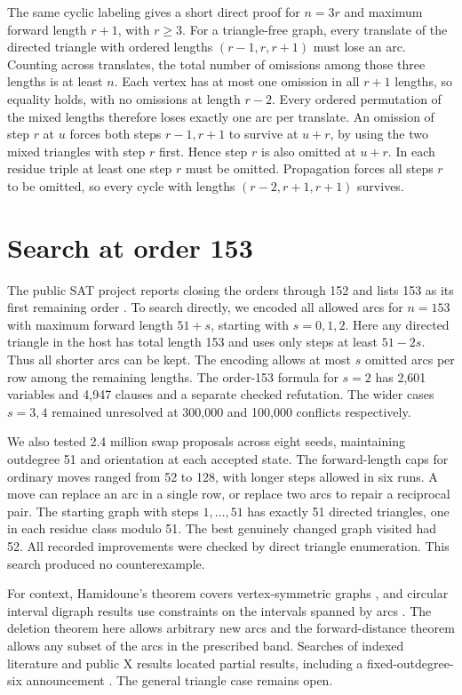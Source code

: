 \documentclass[10pt]{article}
\begin{document}
The same cyclic labeling gives a short direct proof for \(n=3r\) and
maximum forward length \(r+1\), with \(r\ge3\). For a triangle-free
graph, every translate of the directed triangle with ordered lengths
\((r-1,r,r+1)\) must lose an arc. Counting across translates, the total
number of omissions among those three lengths is at least \(n\).
Each vertex has at most one omission in all \(r+1\) lengths, so equality
holds, with no omissions at length \(r-2\). Every ordered permutation
of the mixed lengths therefore loses exactly one arc per translate.
An omission of step \(r\) at \(u\) forces both steps \(r-1,r+1\)
to survive at \(u+r\), by using the two mixed triangles with step \(r\)
first. Hence step \(r\) is also omitted at \(u+r\). In each residue
triple at least one step \(r\) must be omitted. Propagation forces all
steps \(r\) to be omitted, so every cycle with lengths
\((r-2,r+1,r+1)\) survives.

\section{Search at order 153}

The public SAT project reports closing the orders through 152 and lists
153 as its first remaining order \cite{campaign}. To search directly,
we encoded all allowed arcs for \(n=153\) with maximum forward length
\(51+s\), starting with \(s=0,1,2\). Here any directed triangle in
the host has total length 153 and uses only steps at least \(51-2s\).
Thus all shorter arcs can be kept. The encoding allows at most \(s\)
omitted arcs per row among the remaining lengths. The order-153
formula for \(s=2\) has 2,601 variables and 4,947 clauses and a separate
checked refutation. The wider cases \(s=3,4\) remained unresolved at
300,000 and 100,000 conflicts respectively.

We also tested 2.4 million swap proposals across eight seeds, maintaining
outdegree 51 and orientation at each accepted state. The forward-length
caps for ordinary moves ranged from 52 to 128, with longer steps allowed
in six runs. A move can replace an arc in a single row, or replace two
arcs to repair a reciprocal pair. The starting graph with steps
\(1,\ldots,51\) has exactly 51 directed triangles, one in each residue
class modulo 51. The best genuinely changed graph visited had 52.
All recorded improvements were checked by direct triangle enumeration.
This search produced no counterexample.

For context, Hamidoune's theorem covers vertex-symmetric graphs
\cite{ham}, and circular interval digraph results use constraints on
the intervals spanned by arcs \cite{css}. The deletion theorem here
allows arbitrary new arcs and the forward-distance theorem allows any
subset of the arcs in the prescribed band. Searches of indexed
literature and public X results located partial results, including a
fixed-outdegree-six announcement \cite{six}. The general triangle
case remains open.
\end{document}
